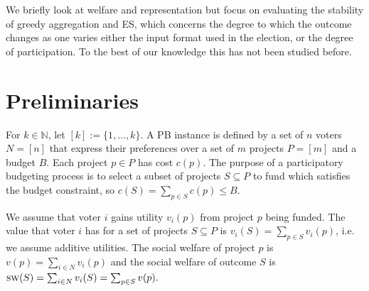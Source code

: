 \documentclass[runningheads]{llncs}
\newcommand{\sw}{\textsc{sw}}
\newcommand{\voters}{{N}}
\newcommand{\mes}{ES}
\begin{document}

We briefly look at welfare and representation but focus on evaluating  the stability of greedy aggregation and \mes{}, which  concerns the degree to which the outcome changes as one varies either the input format used in the election, or the degree of participation.  To the best of our knowledge this has not been studied before. 


\section{Preliminaries}\label{sec:prem}

For   $k\in \mathbb{N}$,  let $[k] := \{1,\ldots,k\}$. A PB instance is defined by a set of $n$ voters $N=[n]$ that express their preferences over a set of $m$  projects $P=[m]$ and a budget $B$. 
Each project  $p\in P$ has cost   $c(p)$. 
The purpose  of  a participatory budgeting process  is to select  a subset of projects $S\subseteq P$  to fund which satisfies the budget constraint, so $c(S) =  \sum_{p\in S} c(p) \leq B$. 



We assume that voter $i$ gains utility $v_i(p)$ from project $p$ being funded. The value that  voter $i$ has for a set of projects $S\subseteq P$ is $v_i(S) = \sum_{p\in S} v_i(p)$, i.e. we assume additive utilities. 
The social welfare of project $p$ is $ v(p) = \sum_{i \in \voters} v_i(p)$ and the social welfare of outcome $S$ is $\sw(S) = \sum_{i\in \voters} v_i(S) = \sum_{p \in S} v(p).$ 
\end{document}
